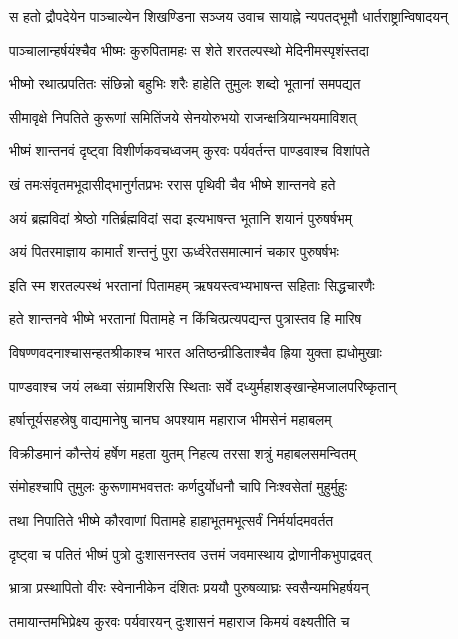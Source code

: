 \threelineshloka
{स हतो द्रौपदेयेन पाञ्चाल्येन शिखण्डिना}
{सञ्जय उवाच}
{सायाह्ने न्यपतद्भूमौ धार्तराष्ट्रान्विषादयन्}


\twolineshloka
{पाञ्चालान्हर्षयंश्चैव भीष्मः कुरुपितामहः}
{स शेते शरतल्पस्थो मेदिनीमस्पृशंस्तदा}


\twolineshloka
{भीष्मो रथात्प्रपतितः संछिन्नो बहुभिः शरैः}
{हाहेति तुमुलः शब्दो भूतानां समपद्यत}


\twolineshloka
{सीमावृक्षे निपतिते कुरूणां समितिंजये}
{सेनयोरुभयो राजन्क्षत्रियान्भयमाविशत्}


\twolineshloka
{भीष्मं शान्तनवं दृष्ट्वा विशीर्णकवचध्वजम्}
{कुरवः पर्यवर्तन्त पाण्डवाश्च विशांपते}


\twolineshloka
{खं तमःसंवृतमभूदासीद्भानुर्गतप्रभः}
{ररास पृथिवी चैव भीष्मे शान्तनवे हते}


\twolineshloka
{अयं ब्रह्मविदां श्रेष्ठो गतिर्ब्रह्मविदां सदा}
{इत्यभाषन्त भूतानि शयानं पुरुषर्षभम्}


\twolineshloka
{अयं पितरमाज्ञाय कामार्तं शन्तनुं पुरा}
{ऊर्ध्वरेतसमात्मानं चकार पुरुषर्षभः}


\twolineshloka
{इति स्म शरतल्पस्थं भरतानां पितामहम्}
{ऋषयस्त्वभ्यभाषन्त सहिताः सिद्धचारणैः}


\twolineshloka
{हते शान्तनवे भीष्मे भरतानां पितामहे}
{न किंचित्प्रत्यपद्यन्त पुत्रास्तव हि मारिष}


\twolineshloka
{विषण्णवदनाश्चासन्हतश्रीकाश्च भारत}
{अतिष्ठन्व्रीडिताश्चैव ह्रिया युक्ता ह्यधोमुखाः}


\twolineshloka
{पाण्डवाश्च जयं लब्ध्वा संग्रामशिरसि स्थिताः}
{सर्वे दध्युर्महाशङ्खान्हेमजालपरिष्कृतान्}


\twolineshloka
{हर्षात्तूर्यसहस्रेषु वाद्यमानेषु चानघ}
{अपश्याम महाराज भीमसेनं महाबलम्}


\twolineshloka
{विक्रीडमानं कौन्तेयं हर्षेण महता युतम्}
{निहत्य तरसा शत्रुं महाबलसमन्वितम्}


\twolineshloka
{संमोहश्चापि तुमुलः कुरूणामभवत्ततः}
{कर्णदुर्योधनौ चापि निःश्वसेतां मुहुर्मुहुः}


\twolineshloka
{तथा निपातिते भीष्मे कौरवाणां पितामहे}
{हाहाभूतमभूत्सर्वं निर्मर्यादमवर्तत}


\twolineshloka
{दृष्ट्वा च पतितं भीष्मं पुत्रो दुःशासनस्तव}
{उत्तमं जवमास्थाय द्रोणानीकभुपाद्रवत्}


\twolineshloka
{भ्रात्रा प्रस्थापितो वीरः स्वेनानीकेन दंशितः}
{प्रययौ पुरुषव्याघ्रः स्वसैन्यमभिहर्षयन्}


\twolineshloka
{तमायान्तमभिप्रेक्ष्य कुरवः पर्यवारयन्}
{दुःशासनं महाराज किमयं वक्ष्यतीति च}


